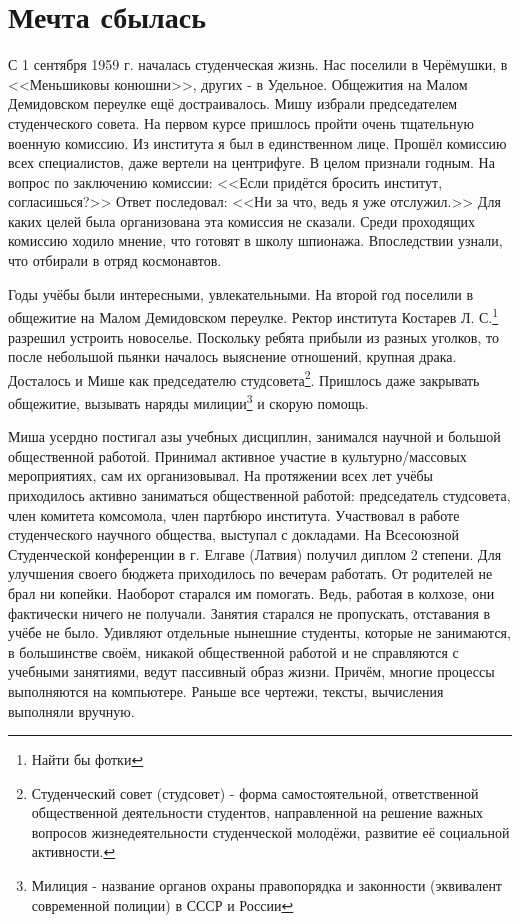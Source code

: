 ﻿\chapter{Мечта сбылась}

С 1 сентября 1959 г. началась студенческая жизнь. Нас поселили в Черёмушки, в <<Меньшиковы конюшни>>, других - в Удельное. Общежития на Малом Демидовском переулке ещё достраивалось. Мишу избрали председателем студенческого совета. На первом курсе пришлось пройти очень тщательную военную комиссию. Из института я был в единственном лице. Прошёл комиссию всех специалистов, даже вертели на центрифуге. В целом признали годным. На вопрос по заключению комиссии: <<Если придётся бросить институт, согласишься?>> Ответ последовал: <<Ни за что, ведь я уже отслужил.>> Для каких целей была организована эта комиссия не сказали. Среди проходящих комиссию ходило мнение, что готовят в школу шпионажа. Впоследствии узнали, что отбирали в отряд космонавтов.

Годы учёбы были интересными, увлекательными. На второй год поселили в общежитие на Малом Демидовском переулке. Ректор института Костарев Л. С.\footnote{Найти бы фотки} разрешил устроить новоселье. Поскольку ребята прибыли из разных уголков, то после небольшой пьянки началось выяснение отношений, крупная драка. Досталось и Мише как председателю студсовета\footnote{Студенческий совет (студсовет) - форма самостоятельной, ответственной общественной деятельности студентов, направленной на решение важных вопросов жизнедеятельности студенческой молодёжи, развитие её социальной активности.}. Пришлось даже закрывать общежитие, вызывать наряды милиции\footnote{Милиция - название органов охраны правопорядка и законности (эквивалент современной полиции) в СССР и России} и скорую помощь.

Миша усердно постигал азы учебных дисциплин, занимался научной и большой общественной работой. Принимал активное участие в культурно\-/массовых мероприятиях, сам их организовывал. На протяжении всех лет учёбы приходилось активно заниматься общественной работой: председатель студсовета, член комитета комсомола, член партбюро института. Участвовал в работе студенческого научного общества, выступал с докладами. На Всесоюзной Студенческой конференции в г. Елгаве (Латвия) получил диплом 2 степени. Для улучшения своего бюджета приходилось по вечерам работать. От родителей не брал ни копейки. Наоборот старался им помогать. Ведь, работая в колхозе, они фактически ничего не получали. Занятия старался не пропускать, отставания в учёбе не было. Удивляют отдельные нынешние студенты, которые не занимаются, в большинстве своём, никакой общественной работой и не справляются с учебными занятиями, ведут пассивный образ жизни. Причём, многие процессы выполняются на компьютере. Раньше все чертежи, тексты, вычисления выполняли вручную.

